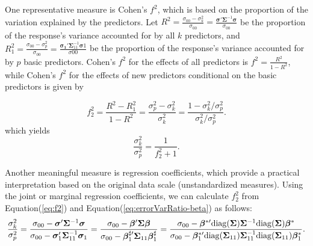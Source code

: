 One representative measure is Cohen's $f^2$, which is based on the proportion of the variation explained by the predictors. 
Let $R^2 = \frac{\sigma_{00}-\sigma^2_k}{\sigma_{00}} = \frac{\boldsymbol{\sigma}' \boldsymbol{\Sigma}^{-1} \boldsymbol{\sigma}}{\sigma_{00}}$ be the proportion of the response's variance accounted for by all $k$ predictors, and $R_1^2 = \frac{\sigma_{00}-\sigma^2_p}{\sigma_{00}} = \frac{\boldsymbol{\sigma_1}' \boldsymbol{\Sigma}_{11}^{-1} \boldsymbol{\sigma}1}{\sigma{00}}$ be the proportion of the response's variance accounted for by $p$ basic predictors. Cohen's $f^2$ for the effects of all predictors is $f^2 = \frac{R^2}{1-R^2}$, while Cohen's $f^2$ for the effects of new predictors conditional on the basic predictors is given by

\begin{equation}
\label{eq:f2}
f_2^2 = \frac{R^2 - R_1^2}{1- R^2} = \frac{\sigma_p^2 - \sigma_k^2}{\sigma_k^2} = \frac{1 - \sigma_k^2/\sigma_p^2}{\sigma_k^2/\sigma_p^2}.
\end{equation}
which yields
\begin{equation}
\label{eq:errorVarRatio-f2}
\frac{\sigma_k^2}{\sigma_p^2}=\frac{1}{f_2^2 + 1}.
\end{equation}

Another meaningful measure is regression coefficients, which provide a practical interpretation based on the original data scale (unstandardized measures). Using the joint or marginal regression coefficients, we can calculate $f_2^2$ from  Equation(\ref{eq:f2}) and Equation(\ref{eq:errorVarRatio-beta}) as follows:
\begin{equation}
\label{eq:errorVarRatio-beta}
\frac{\sigma_k^2}{\sigma_p^2}
=\frac{\sigma_{00} - \boldsymbol{\sigma}' \boldsymbol{\Sigma}^{-1} \boldsymbol{\sigma}}{\sigma_{00} - \boldsymbol{\sigma}_1' \boldsymbol{\Sigma}_{11}^{-1} \boldsymbol{\sigma}_1}
=\frac{\sigma_{00} - \boldsymbol{\beta}' \boldsymbol{\Sigma} \boldsymbol{\beta}}{\sigma_{00} - \boldsymbol{\beta}_1^{\sharp\prime} \boldsymbol{\Sigma}_{11} \boldsymbol{\beta}_1^\sharp}
=\frac{
\sigma_{00} - \boldsymbol{\beta}^{*\prime} {\rm diag}(\boldsymbol{\Sigma}) \boldsymbol{\Sigma}^{-1} {\rm diag}(\boldsymbol{\Sigma})\boldsymbol{\beta}^*
}{
\sigma_{00} - \boldsymbol{\beta}_1^{*\prime} {\rm diag}(\boldsymbol{\Sigma}_{11})\boldsymbol{\Sigma}_{11}^{-1} {\rm diag}(\boldsymbol{\Sigma}_{11})\boldsymbol{\beta}_1^*
}.
\end{equation}
